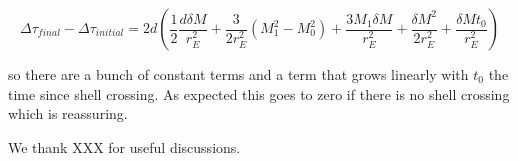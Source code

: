 \documentclass[12pt,letterpaper]{JHEP3}
\begin{document}
\begin{tcolorbox}
\begin{equation}
	\Delta \tau_{final} - \Delta \tau_{initial} = 2d \left( \frac{1}{2} \frac{d \delta M}{r_E^2} + \frac{3}{2r_E^2} (M_1^2 - M_0^2) + \frac{3M_1 \delta M}{r_E^2} + \frac{\delta M^2}{2r_E^2} + \frac{\delta M t_0}{r^2_E} \right)
\end{equation}
\end{tcolorbox}

so there are a bunch of constant terms and a term that grows linearly with $t_0$ the time since shell crossing. As expected this goes to zero if there is no shell crossing which is reassuring. 

%
%


\acknowledgments

We thank XXX for useful discussions. 
\appendix





\appendix
\end{document}
